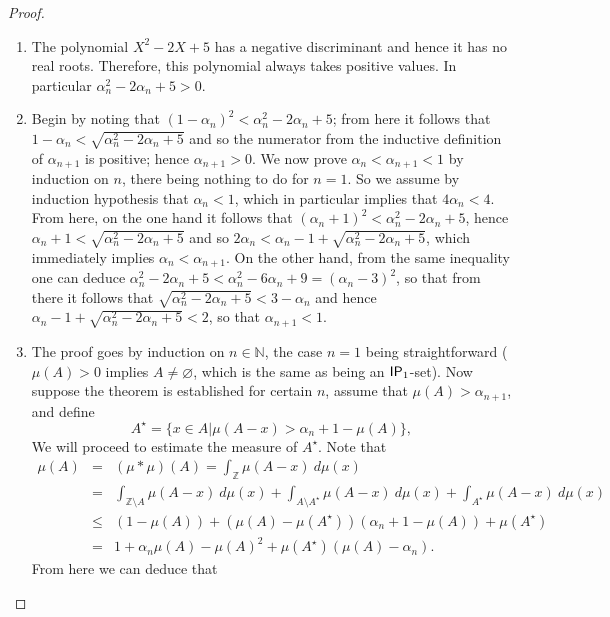 \documentclass{jloganal}
\theoremstyle{definition}
\newcommand{\ip}{\mathnormal{\mathsf{IP}}}
\begin{document}
\begin{proof}\hfill
\begin{enumerate}
    \item The polynomial $X^2-2X+5$ has a negative discriminant and hence it has no real roots. Therefore, this polynomial always takes positive values. In particular $\alpha_n^2-2\alpha_n+5>0$.
    \item Begin by noting that $(1-\alpha_n)^2<\alpha_n^2-2\alpha_n+5$; from here it follows that $1-\alpha_n<\sqrt{\alpha_n^2-2\alpha_n+5}$ and so the numerator from the inductive definition of $\alpha_{n+1}$ is positive; hence $\alpha_{n+1}>0$. We now prove $\alpha_n<\alpha_{n+1}<1$ by induction on $n$, there being nothing to do for $n=1$. So we assume by induction hypothesis that $\alpha_n<1$, which in particular implies that $4\alpha_n<4$. From here, on the one hand it follows that $(\alpha_n+1)^2<\alpha_n^2-2\alpha_n+5$, hence $\alpha_n+1<\sqrt{\alpha_n^2-2\alpha_n+5}$ and so $2\alpha_n<\alpha_n-1+\sqrt{\alpha_n^2-2\alpha_n+5}$, which immediately implies $\alpha_n<\alpha_{n+1}$. On the other hand, from the same inequality one can deduce $\alpha_n^2-2\alpha_n+5<\alpha_n^2-6\alpha_n+9=(\alpha_n-3)^2$, so that from there it follows that $\sqrt{\alpha_n^2-2\alpha_n+5}<3-\alpha_n$ and hence $\alpha_n-1+\sqrt{\alpha_n^2-2\alpha_n+5}<2$, so that $\alpha_{n+1}<1$.
    \item The proof goes by induction on $n\in\mathbb N$, the case $n=1$ being straightforward ($\mu(A)>0$ implies $A\neq\varnothing$, which is the same as being an $\ip_1$-set). Now suppose the theorem is established for certain $n$, assume that $\mu(A)>\alpha_{n+1}$, and define
    \begin{equation*}
        A^\star=\{x\in A\big|\mu(A-x)>\alpha_n+1-\mu(A)\},
    \end{equation*}
    We will proceed to estimate the measure of $A^\star$. Note that
    \begin{eqnarray*}
        \mu(A) & = & (\mu*\mu)(A)=\int_{\mathbb Z}\mu(A-x)\ d\mu(x) \\
        & = & \int_{\mathbb Z\setminus A}\mu(A-x)\ d\mu(x)+\int_{A\setminus A^\star}\mu(A-x)\ d\mu(x)+\int_{A^\star}\mu(A-x)\ d\mu(x) \\
        & \leq & (1-\mu(A))+(\mu(A)-\mu(A^\star))(\alpha_n+1-\mu(A))+\mu(A^\star) \\
        & = & 1+\alpha_n\mu(A)-\mu(A)^2+\mu(A^\star)(\mu(A)-\alpha_n).
    \end{eqnarray*}
    From here we can deduce that
    \begin{equation*}

\end{equation*}
\end{enumerate}
\end{proof}
\end{document}
